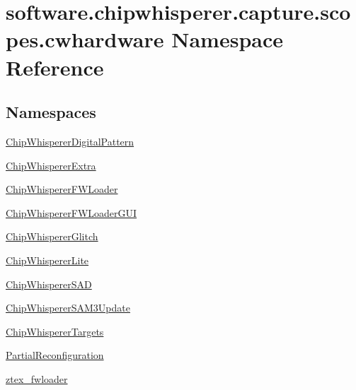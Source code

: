 \hypertarget{namespacesoftware_1_1chipwhisperer_1_1capture_1_1scopes_1_1cwhardware}{}\section{software.\+chipwhisperer.\+capture.\+scopes.\+cwhardware Namespace Reference}
\label{namespacesoftware_1_1chipwhisperer_1_1capture_1_1scopes_1_1cwhardware}
\subsection*{Namespaces}
\begin{DoxyCompactItemize}
\item 
 \hyperlink{namespacesoftware_1_1chipwhisperer_1_1capture_1_1scopes_1_1cwhardware_1_1ChipWhispererDigitalPattern}{Chip\+Whisperer\+Digital\+Pattern}
\item 
 \hyperlink{namespacesoftware_1_1chipwhisperer_1_1capture_1_1scopes_1_1cwhardware_1_1ChipWhispererExtra}{Chip\+Whisperer\+Extra}
\item 
 \hyperlink{namespacesoftware_1_1chipwhisperer_1_1capture_1_1scopes_1_1cwhardware_1_1ChipWhispererFWLoader}{Chip\+Whisperer\+F\+W\+Loader}
\item 
 \hyperlink{namespacesoftware_1_1chipwhisperer_1_1capture_1_1scopes_1_1cwhardware_1_1ChipWhispererFWLoaderGUI}{Chip\+Whisperer\+F\+W\+Loader\+G\+U\+I}
\item 
 \hyperlink{namespacesoftware_1_1chipwhisperer_1_1capture_1_1scopes_1_1cwhardware_1_1ChipWhispererGlitch}{Chip\+Whisperer\+Glitch}
\item 
 \hyperlink{namespacesoftware_1_1chipwhisperer_1_1capture_1_1scopes_1_1cwhardware_1_1ChipWhispererLite}{Chip\+Whisperer\+Lite}
\item 
 \hyperlink{namespacesoftware_1_1chipwhisperer_1_1capture_1_1scopes_1_1cwhardware_1_1ChipWhispererSAD}{Chip\+Whisperer\+S\+A\+D}
\item 
 \hyperlink{namespacesoftware_1_1chipwhisperer_1_1capture_1_1scopes_1_1cwhardware_1_1ChipWhispererSAM3Update}{Chip\+Whisperer\+S\+A\+M3\+Update}
\item 
 \hyperlink{namespacesoftware_1_1chipwhisperer_1_1capture_1_1scopes_1_1cwhardware_1_1ChipWhispererTargets}{Chip\+Whisperer\+Targets}
\item 
 \hyperlink{namespacesoftware_1_1chipwhisperer_1_1capture_1_1scopes_1_1cwhardware_1_1PartialReconfiguration}{Partial\+Reconfiguration}
\item 
 \hyperlink{namespacesoftware_1_1chipwhisperer_1_1capture_1_1scopes_1_1cwhardware_1_1ztex__fwloader}{ztex\+\_\+fwloader}
\end{DoxyCompactItemize}
